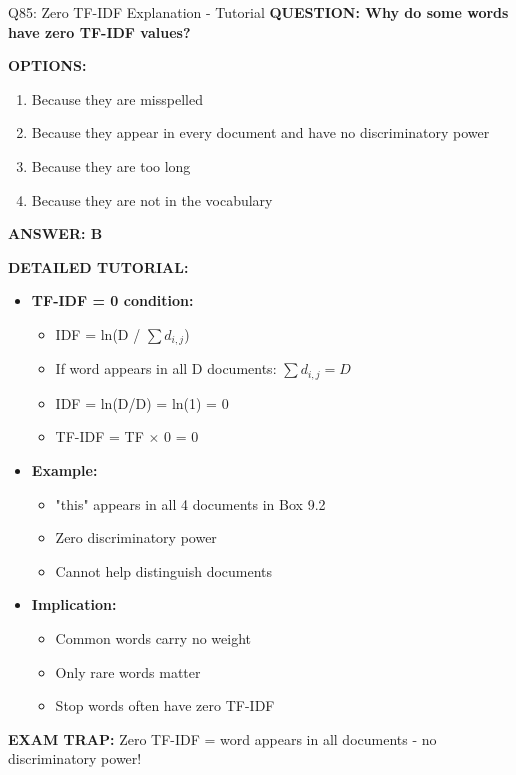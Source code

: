 \documentclass[8pt]{beamer}
\begin{document}
	\begin{frame}{Q85: Zero TF-IDF Explanation - Tutorial}
		\fontsize{6.5}{7.5}\selectfont
		\textbf{QUESTION: Why do some words have zero TF-IDF values?}
		
		\vspace{0.1cm}
		\textbf{OPTIONS:}
		\begin{enumerate}
			\item Because they are misspelled
			\item Because they appear in every document and have no discriminatory power
			\item Because they are too long
			\item Because they are not in the vocabulary
		\end{enumerate}
		
		\vspace{0.1cm}
		\textcolor{myblue}{\textbf{ANSWER: B}}
		
		\vspace{0.1cm}
		\textbf{DETAILED TUTORIAL:}
		\begin{itemize}
			\item \textbf{TF-IDF = 0 condition:}
			\begin{itemize}
				\item IDF = ln(D / $\sum d_{i,j}$)
				\item If word appears in all D documents: $\sum d_{i,j} = D$
				\item IDF = ln(D/D) = ln(1) = 0
				\item TF-IDF = TF $\times$ 0 = 0
			\end{itemize}
			\item \textbf{Example:}
			\begin{itemize}
				\item "this" appears in all 4 documents in Box 9.2
				\item Zero discriminatory power
				\item Cannot help distinguish documents
			\end{itemize}
			\item \textbf{Implication:}
			\begin{itemize}
				\item Common words carry no weight
				\item Only rare words matter
				\item Stop words often have zero TF-IDF
			\end{itemize}
		\end{itemize}
		
		\textcolor{myred}{\textbf{EXAM TRAP:}} Zero TF-IDF = \textcolor{myblue}{word appears in all documents} - no discriminatory power!
	\end{frame}
	
\end{document}

